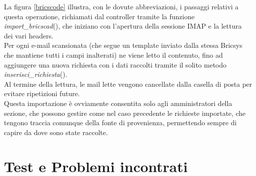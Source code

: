 \noindent La figura \ref{bricscode} illustra, con le dovute abbreviazioni, i passaggi relativi a questa operazione, richiamati dal controller tramite la funzione \textit{import\_bricscad}(), che iniziano con l'apertura della sessione IMAP e la lettura dei vari headers.\\
Per ogni e-mail scansionata (che segue un template inviato dalla stessa Bricsys che mantiene tutti i campi inalterati) ne viene letto il contenuto, fino ad aggiungere una nuova richiesta con i dati raccolti tramite il solito metodo \textit{inserisci\_richiesta}(). \\
Al termine della lettura, le mail lette vengono cancellate dalla casella di posta per evitare ripetizioni future.\\
Questa importazione \`e ovviamente consentita solo agli amministratori della sezione, che possono gestire come nel caso precedente le richieste importate, che tengono traccia comunque della fonte di provenienza, permettendo sempre di capire da dove sono state raccolte.

\chapter{Test e Problemi incontrati}
